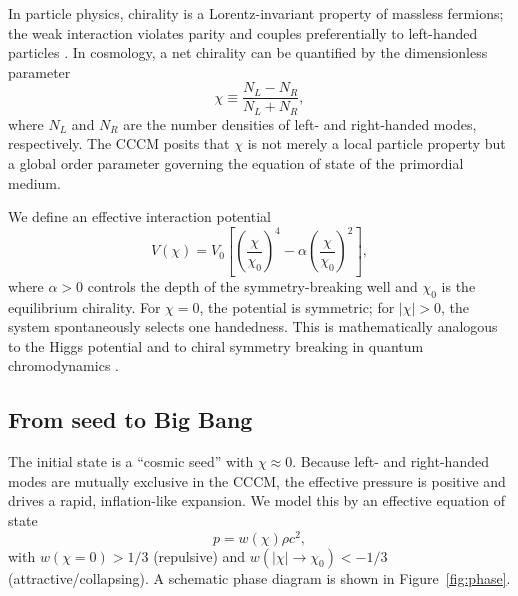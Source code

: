 \documentclass[a4paper,11pt]{article}
\newcommand{\CCCM}{CCCM}
\begin{document}
In particle physics, chirality is a Lorentz-invariant property of massless fermions; the weak interaction violates parity and couples preferentially to left-handed particles \citep{Peskin1995}. In cosmology, a net chirality can be quantified by the dimensionless parameter
\begin{equation}
    \chi \equiv \frac{N_L - N_R}{N_L + N_R},
    \label{eq:chi}
\end{equation}
where $N_L$ and $N_R$ are the number densities of left- and right-handed modes, respectively. The \CCCM{} posits that $\chi$ is not merely a local particle property but a global order parameter governing the equation of state of the primordial medium.

We define an effective interaction potential
\begin{equation}
    V(\chi) = V_0\left[\left(\frac{\chi}{\chi_0}\right)^4 - \alpha\left(\frac{\chi}{\chi_0}\right)^2\right],
    \label{eq:potential}
\end{equation}
where $\alpha > 0$ controls the depth of the symmetry-breaking well and $\chi_0$ is the equilibrium chirality. For $\chi = 0$, the potential is symmetric; for $|\chi| > 0$, the system spontaneously selects one handedness. This is mathematically analogous to the Higgs potential \citep{Higgs1964} and to chiral symmetry breaking in quantum chromodynamics \citep{GellMann1968}.

\subsection{From seed to Big Bang}

The initial state is a ``cosmic seed'' with $\chi \approx 0$. Because left- and right-handed modes are mutually exclusive in the \CCCM, the effective pressure is positive and drives a rapid, inflation-like expansion. We model this by an effective equation of state
\begin{equation}
    p = w(\chi)\rho c^2,
    \label{eq:eos}
\end{equation}
with $w(\chi=0) > 1/3$ (repulsive) and $w(|\chi| \to \chi_0) < -1/3$ (attractive/collapsing). A schematic phase diagram is shown in Figure~\ref{fig:phase}.
\end{document}
